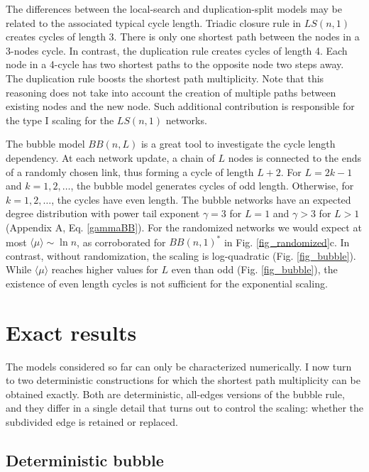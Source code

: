 \documentclass[reprint,aps,pre,amsmath,amssymb,superscriptaddress,showpacs]{revtex4-1}
\begin{document}
The differences between the local-search and duplication-split models may be related to the associated typical cycle length. Triadic closure rule in $LS(n, 1)$ creates cycles of length 3. There is only one shortest path between the nodes in a 3-nodes cycle. In contrast, the duplication rule creates cycles of length 4. Each node in a 4-cycle has two shortest paths to the opposite node two steps away. The duplication rule boosts the shortest path multiplicity. Note that this reasoning does not take into account the creation of multiple paths between existing nodes and the new node. Such additional contribution is responsible for the type I scaling for the $LS(n, 1)$ networks.

The bubble model $BB(n, L)$ is a great tool to investigate the cycle length dependency. At each network update, a chain of $L$ nodes is connected to the ends of a randomly chosen link, thus forming a cycle of length $L+2$. For $L=2k-1$ and $k=1, 2,\ldots$, the bubble model generates cycles of odd length. Otherwise, for $k=1, 2,\ldots$,  the cycles have even length.  The bubble networks have an expected degree distribution with power tail exponent $\gamma =3$ for $L=1$ and $\gamma>3$ for $L>1$ (Appendix A, Eq. \eqref{gammaBB}). For the randomized networks we would expect at most $\langle\mu\rangle \sim \ln n$, as corroborated for $BB(n, 1)^*$ in Fig. \ref{fig_randomized}c. In contrast, without randomization, the scaling is log-quadratic (Fig. \ref{fig_bubble}). While $\langle\mu\rangle$ reaches higher values for $L$ even than odd (Fig. \ref{fig_bubble}), the  existence of even length cycles is not sufficient for the exponential scaling.

\section{Exact results}
\label{exact}

The models considered so far can only be characterized numerically. I now turn to two deterministic constructions for which the shortest path multiplicity can be obtained exactly. Both are deterministic, all-edges versions of the bubble rule, and they differ in a single detail that turns out to control the scaling: whether the subdivided edge is retained or replaced.

\subsection{Deterministic bubble}
\label{deterministic}
\end{document}
